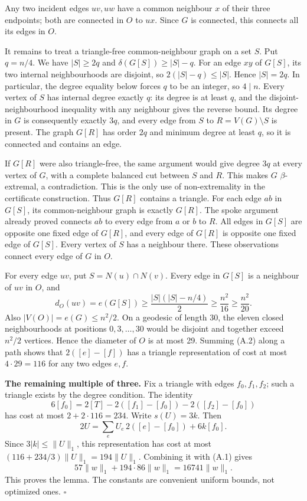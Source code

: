 \documentclass[english,11pt,a4paper]{article}
\begin{document}
Any two incident edges \(uv,uw\) have a common neighbour \(x\) of their three endpoints; both are connected in \(O\) to \(ux\). Since \(G\) is connected, this connects all its edges in \(O\).

It remains to treat a triangle-free common-neighbour graph on a set \(S\). Put \(q=n/4\). We have \(|S|\ge2q\) and \(\delta(G[S])\ge|S|-q\). For an edge \(xy\) of \(G[S]\), its two internal neighbourhoods are disjoint, so \(2(|S|-q)\le|S|\). Hence \(|S|=2q\). In particular, the degree equality below forces \(q\) to be an integer, so \(4\mid n\). Every vertex of \(S\) has internal degree exactly \(q\): its degree is at least \(q\), and the disjoint-neighbourhood inequality with any neighbour gives the reverse bound. Its degree in \(G\) is consequently exactly \(3q\), and every edge from \(S\) to \(R=V(G)\setminus S\) is present. The graph \(G[R]\) has order \(2q\) and minimum degree at least \(q\), so it is connected and contains an edge.

If \(G[R]\) were also triangle-free, the same argument would give degree \(3q\) at every vertex of \(G\), with a complete balanced cut between \(S\) and \(R\). This makes \(G\) \(\beta\)-extremal, a contradiction. This is the only use of non-extremality in the certificate construction. Thus \(G[R]\) contains a triangle. For each edge \(ab\) in \(G[S]\), its common-neighbour graph is exactly \(G[R]\). The spoke argument already proved connects \(ab\) to every edge from \(a\) or \(b\) to \(R\). All edges in \(G[S]\) are opposite one fixed edge of \(G[R]\), and every edge of \(G[R]\) is opposite one fixed edge of \(G[S]\). Every vertex of \(S\) has a neighbour there. These observations connect every edge of \(G\) in \(O\).

For every edge \(uv\), put \(S=N(u)\cap N(v)\). Every edge in \(G[S]\) is a neighbour of \(uv\) in \(O\), and \[d_O(uv)=e(G[S])\ge\frac{|S|(|S|-n/4)}2\ge\frac{n^2}{16}\ge\frac{n^2}{20}.\] Also \(|V(O)|=e(G)\le n^2/2\). On a geodesic of length 30, the eleven closed neighbourhoods at positions \(0,3,\ldots,30\) would be disjoint and together exceed \(n^2/2\) vertices. Hence the diameter of \(O\) is at most 29. Summing (A.2) along a path shows that \(2([e]-[f])\) has a triangle representation of cost at most \(4\cdot29=116\) for any two edges \(e,f\).

\textbf{The remaining multiple of three.} Fix a triangle with edges \(f_0,f_1,f_2\); such a triangle exists by the degree condition. The identity \[6[f_0]=2[T]-2([f_1]-[f_0])-2([f_2]-[f_0])\] has cost at most \(2+2\cdot116=234\). Write \(s(U)=3k\). Then \[2U=\sum_e U_e\,2([e]-[f_0])+6k[f_0].\] Since \(3|k|\le\|U\|_1\), this representation has cost at most \((116+234/3)\|U\|_1=194\|U\|_1\). Combining it with (A.1) gives \[57\|w\|_1+194\cdot86\|w\|_1=16741\|w\|_1.\] This proves the lemma. The constants are convenient uniform bounds, not optimized ones. \(\square\)
\end{document}
